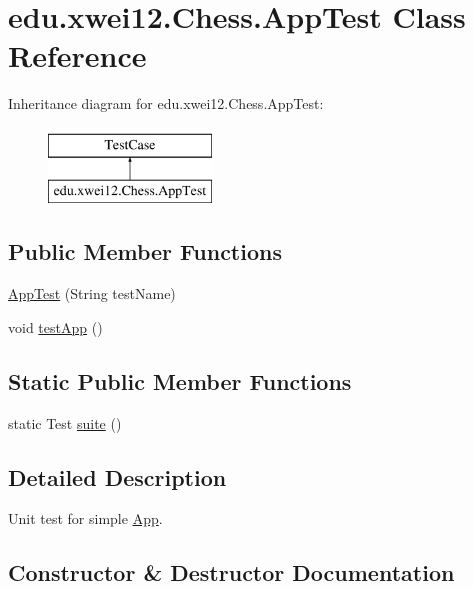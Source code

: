 \hypertarget{classedu_1_1xwei12_1_1_chess_1_1_app_test}{}\section{edu.\+xwei12.\+Chess.\+App\+Test Class Reference}
\label{classedu_1_1xwei12_1_1_chess_1_1_app_test}
Inheritance diagram for edu.\+xwei12.\+Chess.\+App\+Test\+:\begin{figure}[H]
\begin{center}
\leavevmode
\includegraphics[height=2.000000cm]{classedu_1_1xwei12_1_1_chess_1_1_app_test}
\end{center}
\end{figure}
\subsection*{Public Member Functions}
\begin{DoxyCompactItemize}
\item 
\hyperlink{classedu_1_1xwei12_1_1_chess_1_1_app_test_aa1627edae24487f43765d1f095685bba}{App\+Test} (String test\+Name)
\item 
void \hyperlink{classedu_1_1xwei12_1_1_chess_1_1_app_test_a1ad70bb6000f0eb780f17785c0d7ba62}{test\+App} ()
\end{DoxyCompactItemize}
\subsection*{Static Public Member Functions}
\begin{DoxyCompactItemize}
\item 
static Test \hyperlink{classedu_1_1xwei12_1_1_chess_1_1_app_test_adcbaa44acaaf88b060282f6c3604db48}{suite} ()
\end{DoxyCompactItemize}


\subsection{Detailed Description}
Unit test for simple \hyperlink{classedu_1_1xwei12_1_1_chess_1_1_app}{App}. 

\subsection{Constructor \& Destructor Documentation}
